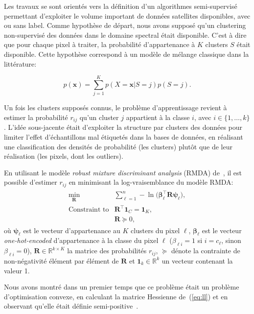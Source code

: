 Les travaux se sont orientés vers la définition d'un algorithmes semi-supervisé permettant d'exploiter le volume important de données satellites disponibles, avec ou sans label. Comme hypothèse de départ, nous avons supposé qu'un clustering non-supervisé des données dans le domaine spectral était disponible. C'est à dire que pour chaque pixel à traiter, la probabilité d'appartenance à \(K\) clusters \(S\) était disponible. Cette hypothèse correspond à un modèle de mélange classique dans la littérature:

\[p(\mathbf{x}) = \sum_{j=1}^Kp(X=\mathbf{x}|S=j)p(S=j).\]

Un fois les clusters supposés connus, le problème d'apprentissage revient à estimer la probabilité \(r_{ij}\) qu'un cluster \(j\) appartient à la classe \(i\), avec \(i\in\{1, \ldots,k\}\). L'idée sous-jacente était d'exploiter la structure par clusters des données pour limiter l'effet d'échantillons mal étiquetés dans la bases de données, en réalisant une classification des densités de probabilité (les clusters) plutôt que de leur réalisation (les pixels, dont les outliers).

En utilisant le modèle \emph{robust mixture discriminant analysis} (RMDA) de~\cite{bouveyron-2009-robus-super}, il est possible d'estimer \(r_{ij}\) en minimisant la log-vraisemblance du modèle RMDA:
\begin{eqnarray}
  \label{eq:ll}
  \begin{array}{rl}
    \displaystyle{\min_{\mathbf{R}}}
   &\displaystyle{\sum_{\ell=1}^n -\ln\big(\boldsymbol{\beta}_\ell^\top\mathbf{R}\boldsymbol{\psi}_\ell\big)},\\
   \text{Constraint to} & \mathbf{R}^\top\mathbf{1}_C = \mathbf{1}_K,\\
  & \mathbf{R} \succcurlyeq 0,
  \end{array}
\end{eqnarray}
où \(\boldsymbol{\psi}_\ell\) est le vecteur d'appartenance au \(K\) clusters du pixel \(\ell\), \(\boldsymbol{\beta}_\ell\) est le vecteur \emph{one-hot-encoded} d'appartenance à la classe du pixel \(\ell\) (\(\beta_{\ell i}=1\) si \(i=c_\ell\), sinon \(\beta_{\ell i}=0\)),  \(\mathbf{R}\in\mathbb{R}^{k\times K}\) la matrice des probabilités \(r_{ij}\), \(\succcurlyeq\) dénote la contrainte de non-négativité élément par élément de \(\mathbf{R}\) et \(\mathbf{1}_k\in\mathbb{R}^k\) un vecteur contenant la valeur 1.

Nous avons montré dans un premier temps que ce problème était un problème d'optimisation convexe, en calculant la matrice Hessienne de~(\ref{eq:ll}) et en observant qu'elle était définie semi-positive~\citep[Section~3.1]{GIRYFOUQUET2021320}.

